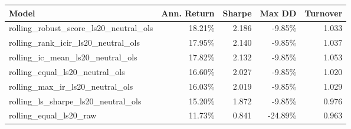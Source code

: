 \begin{tabular}{lrrrr}
\toprule
Model & Ann. Return & Sharpe & Max DD & Turnover \\
\midrule
rolling\_robust\_score\_ls20\_neutral\_ols & 18.21\% & 2.186 & -9.85\% & 1.033 \\
rolling\_rank\_icir\_ls20\_neutral\_ols & 17.95\% & 2.140 & -9.85\% & 1.037 \\
rolling\_ic\_mean\_ls20\_neutral\_ols & 17.82\% & 2.132 & -9.85\% & 1.053 \\
rolling\_equal\_ls20\_neutral\_ols & 16.60\% & 2.027 & -9.85\% & 1.020 \\
rolling\_max\_ir\_ls20\_neutral\_ols & 16.03\% & 2.019 & -9.85\% & 1.029 \\
rolling\_ls\_sharpe\_ls20\_neutral\_ols & 15.20\% & 1.872 & -9.85\% & 0.976 \\
rolling\_equal\_ls20\_raw & 11.73\% & 0.841 & -24.89\% & 0.963 \\
\bottomrule
\end{tabular}
